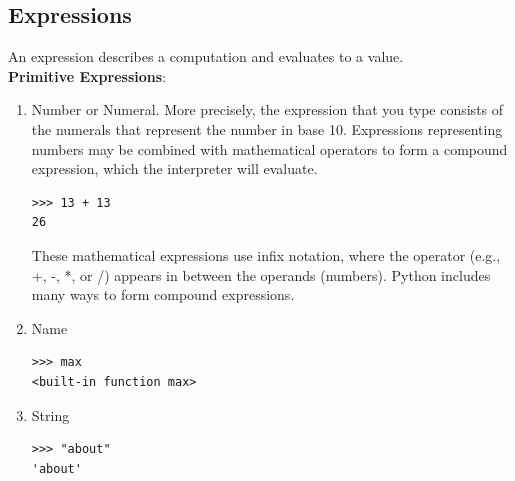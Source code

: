 \documentclass[11pt]{article}
\begin{document}
\subsection{Expressions}
An expression describes a computation and evaluates to a value. \\
\textbf{Primitive Expressions}: 
\begin{enumerate}
\item Number or Numeral. 
More precisely, the expression that you type consists of the numerals that represent the number in base 10. Expressions representing numbers may be combined with mathematical operators to form a compound expression, which the interpreter will evaluate. 
\begin{lstlisting}
>>> 13 + 13
26
\end{lstlisting}
These mathematical expressions use infix notation, where the operator (e.g., +, -, *, or /) appears in between the operands (numbers). Python includes many ways to form compound expressions. 
\item Name
\begin{lstlisting}
>>> max
<built-in function max>
\end{lstlisting}
\item String 
\begin{lstlisting}
>>> "about" 
'about'
\end{lstlisting} 
\end{enumerate}
\end{document}
